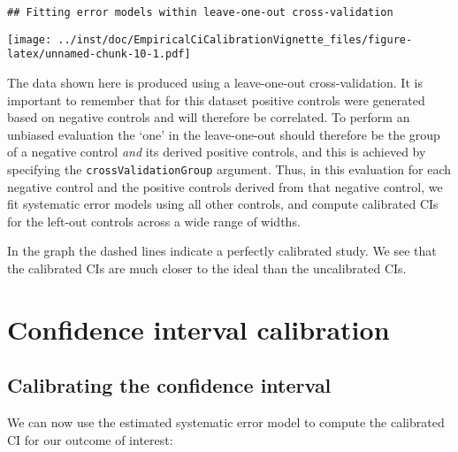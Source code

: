 \documentclass[]{article}
\newenvironment{Shaded}{\begin{snugshade}}{\end{snugshade}}
\newcommand{\DataTypeTok}[1]{\textcolor[rgb]{0.13,0.29,0.53}{#1}}
\newcommand{\KeywordTok}[1]{\textcolor[rgb]{0.13,0.29,0.53}{\textbf{#1}}}
\newcommand{\NormalTok}[1]{#1}
\newcommand{\OperatorTok}[1]{\textcolor[rgb]{0.81,0.36,0.00}{\textbf{#1}}}
\begin{document}
\begin{Shaded}
\end{Shaded}

\begin{verbatim}
## Fitting error models within leave-one-out cross-validation
\end{verbatim}

\texttt{[image: ../inst/doc/EmpiricalCiCalibrationVignette\_files/figure-latex/unnamed-chunk-10-1.pdf]}

The data shown here is produced using a leave-one-out cross-validation.
It is important to remember that for this dataset positive controls were
generated based on negative controls and will therefore be correlated.
To perform an unbiased evaluation the `one' in the leave-one-out should
therefore be the group of a negative control \emph{and} its derived
positive controls, and this is achieved by specifying the
\texttt{crossValidationGroup} argument. Thus, in this evaluation for
each negative control and the positive controls derived from that
negative control, we fit systematic error models using all other
controls, and compute calibrated CIs for the left-out controls across a
wide range of widths.

In the graph the dashed lines indicate a perfectly calibrated study. We
see that the calibrated CIs are much closer to the ideal than the
uncalibrated CIs.

\hypertarget{confidence-interval-calibration}{%
\section{Confidence interval
calibration}\label{confidence-interval-calibration}}

\hypertarget{calibrating-the-confidence-interval}{%
\subsection{Calibrating the confidence
interval}\label{calibrating-the-confidence-interval}}

We can now use the estimated systematic error model to compute the
calibrated CI for our outcome of interest:
\end{document}
